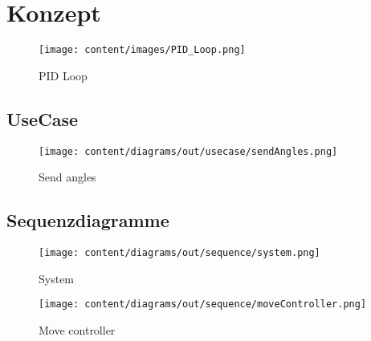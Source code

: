 \section{Konzept}

\begin{figure}[H]
  \begin{center}
    \texttt{[image: content/images/PID\_Loop.png]}
    \caption{PID Loop}
  \end{center}
\end{figure}

\subsection{UseCase}
\begin{figure}[H]
  \begin{center}
    \texttt{[image: content/diagrams/out/usecase/sendAngles.png]}
    \caption{Send angles}
  \end{center}
\end{figure}

\subsection{Sequenzdiagramme}
\begin{figure}[H]
  \begin{center}
    \texttt{[image: content/diagrams/out/sequence/system.png]}
    \caption{System}
  \end{center}
\end{figure}

\begin{figure}[H]
  \begin{center}
    \texttt{[image: content/diagrams/out/sequence/moveController.png]}
    \caption{Move controller}
  \end{center}
\end{figure}

